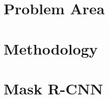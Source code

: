 
\section{Problem Area}



\section{Methodology} \label{Methodology}


\section{ Mask R-CNN }\label{Mask R-CNN}



